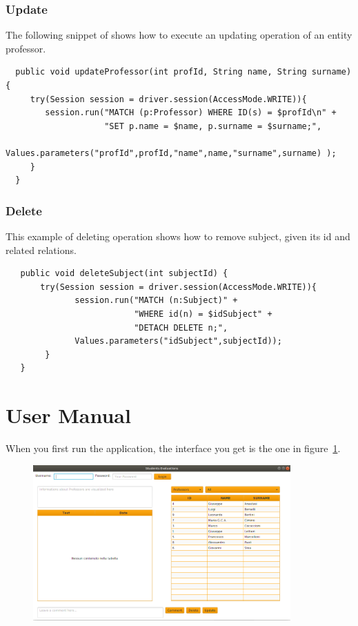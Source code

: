 \documentclass[a4paper]{article}
\begin{document}
\subsubsection{Update}
The following snippet of shows how to execute an updating operation of an entity professor.
\begin{verbatim}
  public void updateProfessor(int profId, String name, String surname) {
     try(Session session = driver.session(AccessMode.WRITE)){
        session.run("MATCH (p:Professor) WHERE ID(s) = $profId\n" + 
                    "SET p.name = $name, p.surname = $surname;",
        Values.parameters("profId",profId,"name",name,"surname",surname) );
     }
  }
\end{verbatim}

\subsubsection{Delete}
This example of deleting operation shows how to remove subject, given its id and related relations.

\begin{verbatim}
   public void deleteSubject(int subjectId) {
       try(Session session = driver.session(AccessMode.WRITE)){
              session.run("MATCH (n:Subject)" +
                          "WHERE id(n) = $idSubject" +
                          "DETACH DELETE n;",
              Values.parameters("idSubject",subjectId));
        }
   }
\end{verbatim}
\clearpage
\section{User Manual}
When you first run the application, the interface you get is the one in figure~\ref{fig:screen0}. 

\begin{figure}[h]
\centering
\includegraphics[width=0.88\textwidth]{images/screens/screen0}
\label{fig:screen0}
\end{figure}
\end{document}
